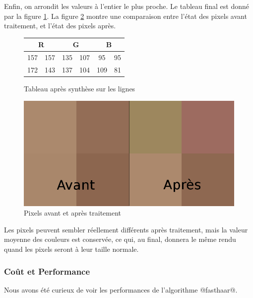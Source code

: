 \documentclass{article}
\begin{document}
Enfin, on arrondit les valeurs à l'entier le plus proche. Le tableau final est donné par la figure \ref{tab7}. La figure \ref{after} montre une comparaison entre l'état des pixels avant traitement, et l'état des pixels après.

\begin{figure}[!h]
\begin{center}
\begin{tabular}{|c|c|c|c|c|c|}
\hline
\multicolumn{2}{|c|}{R} & \multicolumn{2}{|c|}{G}  & \multicolumn{2}{|c|}{B} \\
\hline
157    & 157  &   135  & 107 &   95  & 95   \\ 
\hline
172   & 143   &   137  & 104 &   109  & 81 \\
\hline
\end{tabular}
\end{center}
\caption{Tableau après synthèse sur les lignes}
\label{tab7}
\end{figure}

\begin{figure}[!h]
\centering
\includegraphics[scale=0.3]{aprescompress.jpg}
\caption{Pixels avant et après traitement}
\label{after}
\end{figure}

Les pixels peuvent sembler réellement différents après traitement, mais la valeur moyenne des couleurs est conservée, ce qui, au final, donnera le même rendu quand les pixels seront à leur taille normale.

\clearpage

\subsubsection{Coût et Performance}

Nous avons été curieux de voir les performances de l'algorithme @fasthaar@.
\end{document}
